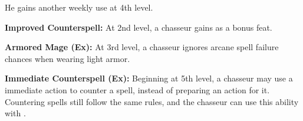 {He gains another weekly use at 4th level.

\textbf{Improved Counterspell:} At 2nd level, a chasseur gains  as a bonus feat.

\textbf{Armored Mage (Ex):} At 3rd level, a chasseur ignores arcane spell failure chances when wearing light armor.

\textbf{Immediate Counterspell (Ex):} Beginning at 5th level, a chasseur may use a immediate action to counter a spell, instead of preparing an action for it. Countering spells still follow the same rules, and the chasseur can use this ability with .
}
